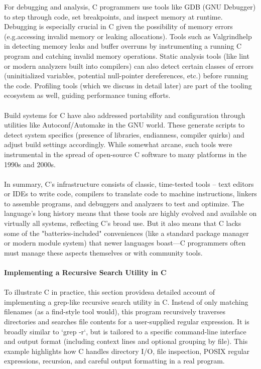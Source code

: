 \documentclass{article}
\begin{document}
{\normalsize For debugging and analysis, C programmers use tools like GDB (GNU Debugger) to step through code, set b}{\normalsize reakpoints, and inspect memory at runtime. Debugging is especially crucial in C given the possibility of memory errors (}{\normalsize e.g.}{\normalsize  accessing invalid memory or leaking allocations). Tools such as }{\normalsize Valgrind}{\normalsize  help in detecting memory leaks and buffer overruns by inst}{\normalsize rumenting a running C program and catching invalid memory operations. Static analysis tools (like lint or modern analyzers built into compilers) can also detect certain classes of errors (uninitialized variables, potential null-pointer dereferences, etc.) }{\normalsize before running the code. Profiling tools (which we discuss in detail later) are part of the tooling ecosystem as well, guiding performance tuning efforts.}\\
\\
{\normalsize Build systems for C have also addressed portability and configuration through utilities like }{\normalsize Autocon}{\normalsize f}{\normalsize /Automake in the GNU world. These generate scripts to detect system specifics (presence of libraries, endianness, compiler quirks) and adjust build settings accordingly. While somewhat arcane, such tools were instrumental in the spread of open-source C so}{\normalsize ftware to many platforms in the 1990s and 2000s.}\\
\\
{\normalsize In summary, C's infrastructure consists of classic, time-tested tools – text editors or IDEs to write code, compilers to translate code to machine instructions, linkers to assemble programs, and debuggers a}{\normalsize nd analyzers to test and optimize. The language's long history means that these tools are highly evolved and available on virtually all systems, reflecting C's broad use. But it also means that C lacks some of the "batteries-included" conveniences (like a }{\normalsize standard package manager or modern module system) that newer languages boast—C programmers often must manage these aspects themselves or with community tools.}\\
\\
{\Large \textbf{Implementing a Recursive Search Utility in C}}\\
\\
{\normalsize To illustrate C in practice, this section provides}{\normalsize  a detailed account of implementing a grep-like recursive search utility in C. Instead of only matching filenames (as a find-style tool would), this program recursively traverses directories and searches file contents for a user-supplied regular expression}{\normalsize . It is broadly similar to `grep -r`, but is tailored to a specific command-line interface and output format (including context lines and optional grouping by file). This example highlights how C handles directory I/O, file inspection, POSIX regular expres}{\normalsize sions, recursion, and careful output formatting in a real program.}\\
\end{document}

